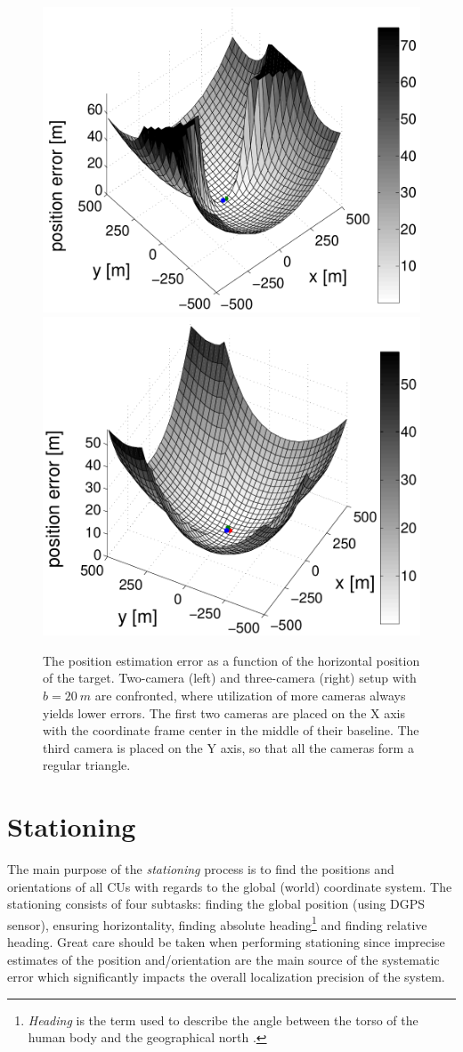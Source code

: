 \begin{figure}[htb]\centering
	\centering
	\includegraphics[width=0.49\linewidth]{fig/error_analysis_2units.pdf}
	\includegraphics[width=0.49\linewidth]{fig/error_analysis_3units.pdf}
	\caption{The position estimation error as a function of the horizontal position of the target. Two-camera (left) and three-camera (right) setup with $b = 20\ m$ are confronted, where utilization of more cameras always yields lower errors. The first two cameras are placed on the X axis with the coordinate frame center in the middle of their baseline. The third camera is placed on the Y axis, so that all the cameras form a regular triangle.} 
	\label{fig:errorMapGivenTargetPosition}
\end{figure}


\section{Stationing} \label{txt:stationing}

The main purpose of the \textit{stationing} process is to find the positions and orientations of all CUs with regards to the global (world) coordinate system. The stationing consists of four subtasks: finding the global position (using DGPS sensor), ensuring horizontality, finding absolute heading\footnote{\textit{Heading} is the term used to describe the angle between the torso of the human body and the geographical north \cite{Henriksson648760}.} and finding relative heading. Great care should be taken when performing stationing since imprecise estimates of the position and/orientation are the main source of the systematic error which significantly impacts the overall localization precision of the system.

